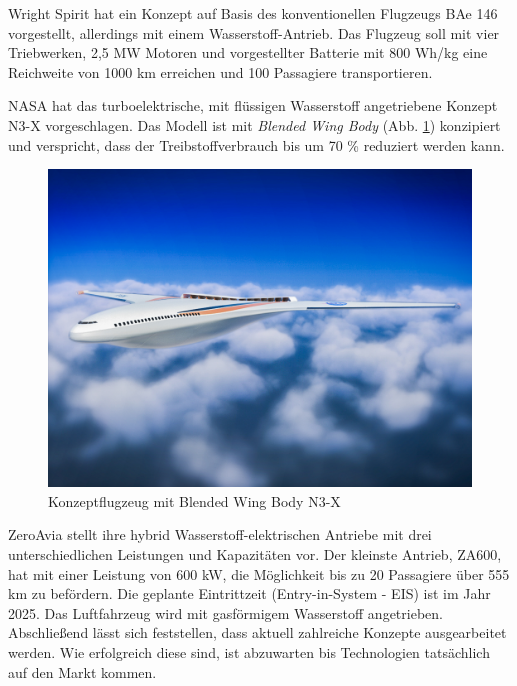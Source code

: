 Wright Spirit \cite{wright_electric_website} hat ein Konzept auf Basis 
des konventionellen Flugzeugs BAe 146 vorgestellt, allerdings mit einem Wasserstoff-Antrieb.
Das Flugzeug soll mit vier Triebwerken, 2,5 MW Motoren und vorgestellter Batterie 
mit 800 Wh/kg eine Reichweite von 1000 km erreichen und 100 Passagiere transportieren.

NASA hat das turboelektrische, mit flüssigen Wasserstoff angetriebene 
Konzept N3-X \cite{NASA_N3X_2025} vorgeschlagen.
Das Modell ist mit \textit{Blended Wing Body} (Abb. \ref{NASA_konfig}) konzipiert und verspricht, 
dass der Treibstoffverbrauch bis um 70 \% reduziert werden kann.
\begin{figure}[h]
	\centering
	\includegraphics[width=0.6\linewidth]{Bilder/NASA.jpg}
	\caption[NASA]{Konzeptflugzeug mit Blended Wing Body N3-X \cite{NASA_N3X_2025} }
	\label{NASA_konfig}
\end{figure}

ZeroAvia stellt ihre hybrid Wasserstoff-elektrischen Antriebe 
mit drei unterschiedlichen Leistungen und Kapazitäten vor. 
Der kleinste Antrieb, ZA600, hat mit einer Leistung von 600 kW,
die Möglichkeit bis zu 20 Passagiere über 555 km zu befördern. 
Die geplante Eintrittzeit (Entry-in-System - EIS) ist im Jahr 2025. 
Das Luftfahrzeug wird mit gasförmigem Wasserstoff angetrieben.
%
Abschließend lässt sich feststellen, dass aktuell zahlreiche Konzepte ausgearbeitet werden. 
Wie erfolgreich diese sind, ist abzuwarten bis Technologien tatsächlich auf den Markt kommen.
